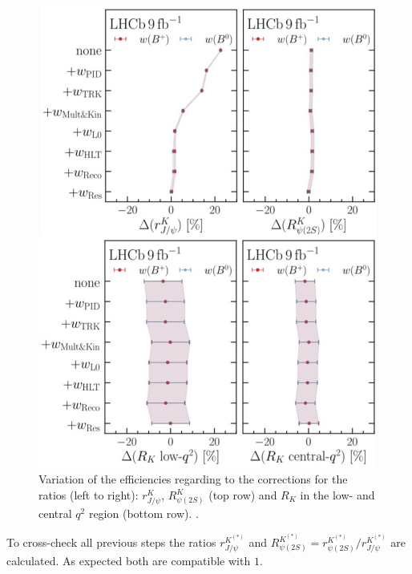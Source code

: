 \begin{figure}
    \centering
    \includegraphics[width=0.9\linewidth]{figures/weights_cut.png}
    \caption{Variation of the efficiencies regarding to the corrections for the ratios (left to right):
    $r^{K}_{J\!/\!\psi}$, $R^{K}_{\psi(2S)}$ (top row) and $R_{K}$ in the low- and central $q^2$ region (bottom row).
    \cite{lhcbcollaboration2022test}.}
    \label{fig:weights}
\end{figure}
To cross-check all previous steps the ratios $r^{K^{(*)}}_{J\!/\!\psi}$ and 
${R^{K^{(*)}}_{\psi(2S)}=r^{K^{(*)}}_{\psi(2S)}/r^{K^{(*)}}_{J\!/\!\psi}}$ 
are calculated. As expected both are compatible with $\num{1}$.

